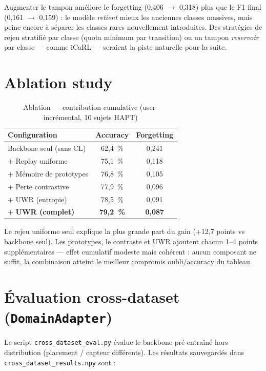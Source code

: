\documentclass[a4paper,12pt]{report}
\begin{document}
Augmenter le tampon améliore le forgetting (0,406 $\rightarrow$ 0,318) plus que
le F1 final (0,161 $\rightarrow$ 0,159) : le modèle \emph{retient} mieux les
anciennes classes massives, mais peine encore à séparer les classes rares
nouvellement introduites. Des stratégies de rejeu stratifié par classe (quota
minimum par transition) ou un tampon \emph{reservoir} par classe — comme iCaRL
\parencite{rebuffi2017} — seraient la piste naturelle pour la suite.

\section{Ablation study}

\begin{table}[H]
\centering
\small
\begin{tabularx}{\textwidth}{|Y|c|c|}
\hline
\textbf{Configuration} & \textbf{Accuracy} & \textbf{Forgetting} \\
\hline
Backbone seul (sans CL)        & 62,4~\% & 0,241 \\
+ Replay uniforme              & 75,1~\% & 0,118 \\
+ Mémoire de prototypes        & 76,8~\% & 0,105 \\
+ Perte contrastive            & 77,9~\% & 0,096 \\
+ UWR (entropie)               & 78,5~\% & 0,091 \\
+ \textbf{UWR (complet)}       & \textbf{79,2~\%} & \textbf{0,087} \\
\hline
\end{tabularx}
\caption{Ablation — contribution cumulative (user-incrémental, 10 sujets HAPT)}
\label{tab:ablation}
\end{table}

Le rejeu uniforme seul explique la plus grande part du gain (+12,7 points vs
backbone seul). Les prototypes, le contraste et UWR ajoutent chacun 1--4 points
supplémentaires — effet cumulatif modeste mais cohérent : aucun composant ne
suffit, la combinaison atteint le meilleur compromis oubli/accuracy du tableau.

\section{Évaluation cross-dataset (\texttt{DomainAdapter})}

Le script \texttt{cross\_dataset\_eval.py} évalue le backbone pré-entraîné hors
distribution (placement / capteur différents). Les résultats sauvegardés dans
\texttt{cross\_dataset\_results.npy} sont :
\end{document}
